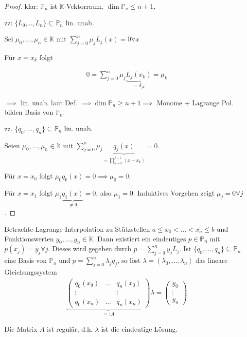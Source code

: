 \begin{proof}
	klar: $\mathbb{P}_n$ ist $\mathbb{K}$-Vektorraum, $\dim \mathbb{P}_n \leq n+1$,
	
	zz: $\{L_0, .., L_n\} \subseteq \mathbb{P}_n$ lin. unab.
	
	Sei $\mu_0, ..., \mu_n \in \mathbb{K}$ mit $\sum_{j=0}^{n} \mu_j L_j(x) = 0 \forall x$
	
	Für $x=x_k$ folgt
	
	\begin{align*}
		0 = \sum_{j=0}^{n} \mu_j \underbrace{L_j(x_k)}_{=\delta_{jk}} = \mu_k
	\end{align*}
	
	$\implies$ lin. unab. laut Def. $\implies \dim \mathbb{P}_n \geq n+1 \implies$ Monome + Lagrange Pol. bilden Basis von $\mathbb{P}_n$.
	
	zz. $\{q_0, ..., q_n\} \subseteq \mathbb{P}_n$ lin. unab.
	
	Seien $\mu_0, ..., \mu_n \in \mathbb{K}$ mit $\sum_{j=0}^{n} \mu_j \underbrace{q_j(x)}_{=\prod_{k=0}^{j-1}(x-x_k)} = 0$.
	
	Für $x=x_0$ folgt $\mu_0 q_0(x) = 0 \implies \mu_0 = 0$.
	
	Für $x=x_1$ folgt $\mu_1 \underbrace{q_1(x)}_{\neq 0} = 0$, also $\mu_1 = 0$. Induktives Vorgehen zeigt $\mu_j=0 \forall j$.
\end{proof}

\begin{theorem}
	Betrachte Lagrange-Interpolation zu Stützstellen $a \leq x_0 < ... < x_n \leq b$ und Funktionswerten $y_0, ..., y_n \in \mathbb{K}$. Dann existiert ein eindeutiges $p \in \mathbb{P}_n$ mit $p(x_j) = y_j \forall j$. Dieses wird gegeben durch $p = \sum_{j=0}^{n} y_j L_j$. Ist $\{q_0, ..., q_n\} \subseteq \mathbb{P}_n$ eine Basis von $\mathbb{P}_n$ und $p = \sum_{j=0}^{n} \lambda_j q_j$, so löst $\lambda = (\lambda_0, ..., \lambda_n)$ das lineare Gleichungssystem
	\begin{align*}
		\underbrace{\left(\begin{matrix}
			q_0(x_0) & ... & q_n(x_0)\\
			\vdots & & \vdots\\
			q_0(x_n) & ... & q_n(x_n)
		\end{matrix}\right)}_{=: A}\lambda = 
		\left(\begin{matrix}
			y_0\\ \vdots\\ y_n
		\end{matrix}\right)
	\end{align*}
	
	Die Matrix $A$ ist regulär, d.h. $\lambda$ ist die eindeutige Lösung.
\end{theorem}

